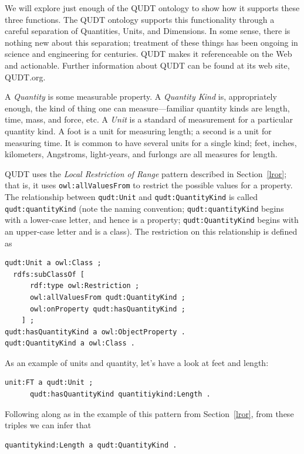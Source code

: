 We will explore just enough of the QUDT ontology to show how it supports
these three functions. The QUDT ontology supports this functionality
through a careful separation of Quantities, Units, and Dimensions. In
some sense, there is nothing new about this separation; treatment of
these things has been ongoing in science and engineering for centuries.
QUDT makes it referenceable on the Web and actionable. Further
information about QUDT can be found at its web site, QUDT.org.

A \emph{Quantity} is some measurable property. A \emph{Quantity Kind} is,
appropriately enough, the kind of thing one can measure---familiar
quantity kinds are length, time, mass, and force, etc. A \emph{Unit} is a
standard of measurement for a particular quantity kind. A foot is a unit
for measuring length; a second is a unit for measuring time. It is
common to have several units for a single kind; feet, inches,
kilometers, Angstroms, light-years, and furlongs are all measures for
length.

QUDT uses the \emph{Local Restriction of Range} pattern described in Section~\ref{lror}; that is, it uses
\texttt{owl:allValuesFrom} to restrict the possible values for a property. The
relationship between \texttt{qudt:Unit} and \texttt{qudt:QuantityKind} is called
\texttt{qudt:quantityKind} (note the naming convention; \texttt{qudt:quantityKind} begins
with a lower-case letter, and hence is a property; \texttt{qudt:QuantityKind}
begins with an upper-case letter and is a class). The restriction on
this relationship is defined as

\begin{lstlisting}
qudt:Unit a owl:Class ;
  rdfs:subClassOf [
      rdf:type owl:Restriction ;
      owl:allValuesFrom qudt:QuantityKind ;
      owl:onProperty qudt:hasQuantityKind ;
    ] ;
qudt:hasQuantityKind a owl:ObjectProperty .
qudt:QuantityKind a owl:Class .
\end{lstlisting}


As an example of units and quantity, let's have a look at feet and
length:

\begin{lstlisting}
unit:FT a qudt:Unit ;
      qudt:hasQuantityKind quantitiykind:Length .
\end{lstlisting}

Following along as in the example of this pattern from Section~\ref{lror}, from
these triples we can infer that

\begin{lstlisting}
quantitykind:Length a qudt:QuantityKind .
\end{lstlisting}

